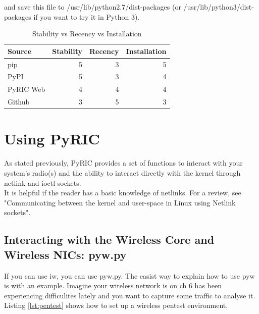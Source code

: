 \documentclass[11pt]{article}
\begin{document}
and save this file to /usr/lib/python2.7/dist-packages (or 
/usr/lib/python3/dist-packages if you want to try it in Python 3).

\begin{table}
\begin{center}
\begin{tabular}{| l | r | r | r | }
\hline
Source & Stability & Recency & Installation \\
\hline
pip & 5 & 3 & 5\\
\hline
PyPI & 5 & 3 & 4\\
\hline
PyRIC Web & 4 & 4 & 4\\
\hline
Github & 3 & 5 & 3\\
\hline
\end{tabular}
\caption{Stability vs Recency vs Installation}
\end{center}
\label{tab:install}
\end{table}

\section{Using PyRIC}\label{sec:using}
As stated previously, PyRIC provides a set of functions to interact with your 
system's radio(s) and the ability to interact directly with the kernel through
netlink and ioctl sockets. \\

It is helpful if the reader has a basic knowledge of netlinks. For a review, see "Communicating between the kernel and user-space in Linux using Netlink sockets". 

\subsection{Interacting with the Wireless Core and Wireless NICs: pyw.py}
If you can use iw, you can use pyw.py. The easist way to explain how to use pyw 
is with an example. Imagine your wireless network is on ch 6 has been experiencing 
difficulites lately and you want to capture some traffic to analyse it. Listing 
\ref{lst:pentest} shows how to set up a wireless pentest environment. \\
\end{document}
